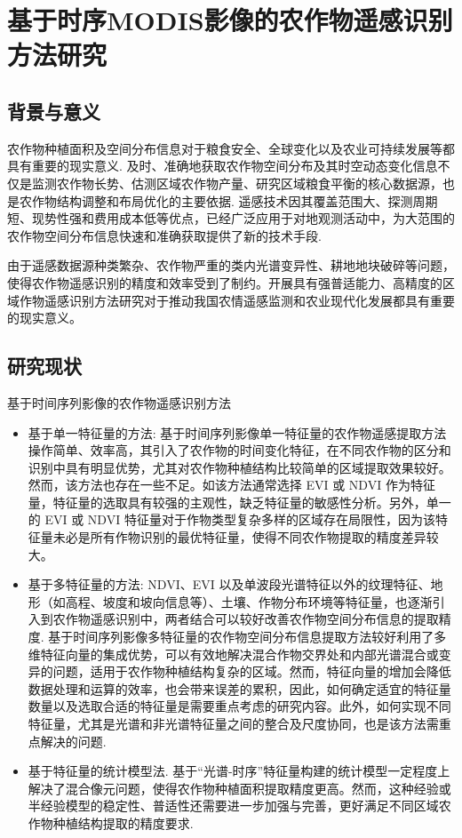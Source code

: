 \section{基于时序MODIS影像的农作物遥感识别方法研究}

\subsection{背景与意义}
农作物种植面积及空间分布信息对于粮食安全、全球变化以及农业可持续发展等都具有重要的现实意义. 及时、准确地获取农作物空间分布及其时空动态变化信息不仅是监测农作物长势、估测区域农作物产量、研究区域粮食平衡的核心数据源，也是农作物结构调整和布局优化的主要依据. 遥感技术因其覆盖范围大、探测周期短、现势性强和费用成本低等优点，已经广泛应用于对地观测活动中，为大范围的农作物空间分布信息快速和准确获取提供了新的技术手段.

由于遥感数据源种类繁杂、农作物严重的类内光谱变异性、耕地地块破碎等问题，使得农作物遥感识别的精度和效率受到了制约。开展具有强普适能力、高精度的区域作物遥感识别方法研究对于推动我国农情遥感监测和农业现代化发展都具有重要的现实意义。 

\subsection{研究现状}
基于时间序列影像的农作物遥感识别方法
\begin{itemize}
    \item 基于单一特征量的方法: 基于时间序列影像单一特征量的农作物遥感提取方法操作简单、效率高，其引入了农作物的时间变化特征，在不同农作物的区分和识别中具有明显优势，尤其对农作物种植结构比较简单的区域提取效果较好。然而，该方法也存在一些不足。如该方法通常选择 EVI 或 NDVI 作为特征量，特征量的选取具有较强的主观性，缺乏特征量的敏感性分析。另外，单一的 EVI 或 NDVI 特征量对于作物类型复杂多样的区域存在局限性，因为该特征量未必是所有作物识别的最优特征量，使得不同农作物提取的精度差异较大。
    \item 基于多特征量的方法: NDVI、EVI 以及单波段光谱特征以外的纹理特征、地形（如高程、坡度和坡向信息等）、土壤、作物分布环境等特征量，也逐渐引入到农作物遥感识别中，两者结合可以较好改善农作物空间分布信息的提取精度. 基于时间序列影像多特征量的农作物空间分布信息提取方法较好利用了多维特征向量的集成优势，可以有效地解决混合作物交界处和内部光谱混合或变异的问题，适用于农作物种植结构复杂的区域。然而，特征向量的增加会降低数据处理和运算的效率，也会带来误差的累积，因此，如何确定适宜的特征量数量以及选取合适的特征量是需要重点考虑的研究内容。此外，如何实现不同特征量，尤其是光谱和非光谱特征量之间的整合及尺度协同，也是该方法需重点解决的问题.
    \item 基于特征量的统计模型法. 基于``光谱-时序''特征量构建的统计模型一定程度上解决了混合像元问题，使得农作物种植面积提取精度更高。然而，这种经验或半经验模型的稳定性、普适性还需要进一步加强与完善，更好满足不同区域农作物种植结构提取的精度要求.
\end{itemize}

